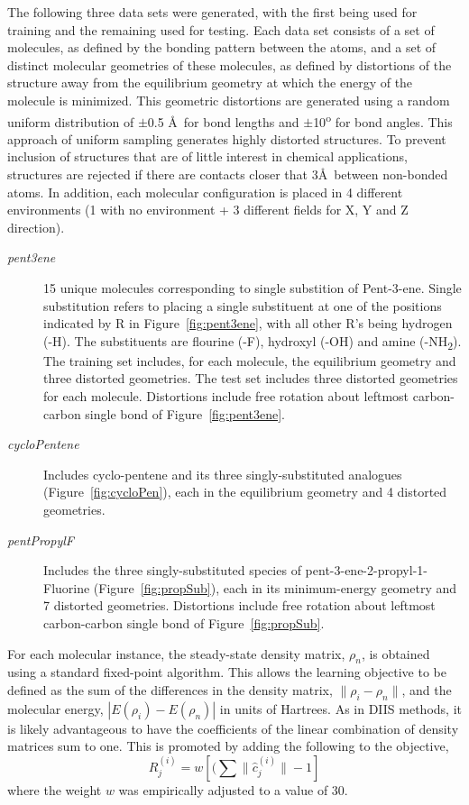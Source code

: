 \documentclass[twoside,11pt]{article}
\begin{document}
The following three data sets were generated, with the first being used for training and the remaining used for testing. Each data set consists of a set of molecules, as defined by the bonding pattern between the atoms, and a set of distinct molecular geometries of these molecules, as defined by distortions of the structure away from the equilibrium geometry at which the energy of the molecule is minimized. This geometric distortions are generated using a random uniform distribution of $\pm$0.5 \AA\ for bond lengths and $\pm$10\textsuperscript{o} for bond angles.  This approach of uniform sampling generates highly distorted structures. To prevent inclusion of structures that are of little interest in chemical applications, structures are rejected if there are contacts closer that 3\AA\ between non-bonded atoms.  In addition, each molecular configuration is placed in 4 different environments (1 with no environment + 3 different fields for X, Y and Z direction).
\begin{description}
\item[\textit{pent3ene}] 15 unique molecules corresponding to single substition of Pent-3-ene. Single substitution refers to placing a single substituent at one of the positions indicated by R in Figure~\ref{fig:pent3ene}, with all other R's being hydrogen (-H). The substituents are flourine (-F), hydroxyl (-OH) and amine (-NH\textsubscript{2}). The training set includes, for each molecule, the equilibrium geometry and three distorted geometries. The test set includes three distorted geometries for each molecule. Distortions include free rotation about leftmost carbon-carbon single bond of Figure~\ref{fig:pent3ene}. 
\item[\textit{cycloPentene}]Includes cyclo-pentene and its three singly-substituted analogues (Figure~\ref{fig:cycloPen}), each in the equilibrium geometry and 4 distorted geometries. 
\item[\textit{pentPropylF}] Includes the three singly-substituted species of pent-3-ene-2-propyl-1-Fluorine (Figure~\ref{fig:propSub}), each in its minimum-energy geometry and 7 distorted geometries. Distortions include free rotation about leftmost carbon-carbon single bond of Figure~\ref{fig:propSub}. 
\end{description}

For each molecular instance, the steady-state density matrix, $\rho_n$, is obtained using a standard fixed-point algorithm\cite{Pulay1980}. This allows the learning objective to be defined as the sum of the differences in the density matrix, $\|\rho_i-\rho_n\|$, and the molecular energy, $|E(\rho_i)-E(\rho_n)|$ in units of Hartrees. As in DIIS methods\cite{scusceria}, it is likely advantageous to have the coefficients of the linear combination of density matrices sum to one. This is promoted by adding the following to the objective,
\[
R^{(i)}_j =  w [(\sum \|\hat{c}^{(i)}_j\| - 1]
\]
where the weight $w$ was empirically adjusted to a value of 30. 
\end{document}
